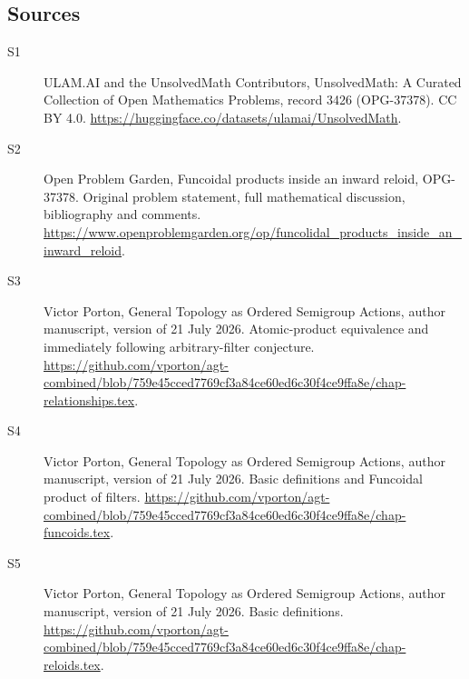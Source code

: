 \documentclass[11pt]{article}
\begin{document}
\subsection{Sources}
\begin{description}
\item[\hypertarget{source:3426:1}{S1}] ULAM.AI and the UnsolvedMath Contributors, UnsolvedMath: A Curated Collection of Open Mathematics Problems, record 3426 (OPG-37378). CC BY 4.0. \url{https://huggingface.co/datasets/ulamai/UnsolvedMath}.
\item[\hypertarget{source:3426:2}{S2}] Open Problem Garden, Funcoidal products inside an inward reloid, OPG-37378. Original problem statement, full mathematical discussion, bibliography and comments. \url{https://www.openproblemgarden.org/op/funcolidal_products_inside_an_inward_reloid}.
\item[\hypertarget{source:3426:3}{S3}] Victor Porton, General Topology as Ordered Semigroup Actions, author manuscript, version of 21 July 2026. Atomic-product equivalence and immediately following arbitrary-filter conjecture. \url{https://github.com/vporton/agt-combined/blob/759e45cced7769cf3a84ce60ed6c30f4ce9ffa8e/chap-relationships.tex}.
\item[\hypertarget{source:3426:4}{S4}] Victor Porton, General Topology as Ordered Semigroup Actions, author manuscript, version of 21 July 2026. Basic definitions and Funcoidal product of filters. \url{https://github.com/vporton/agt-combined/blob/759e45cced7769cf3a84ce60ed6c30f4ce9ffa8e/chap-funcoids.tex}.
\item[\hypertarget{source:3426:5}{S5}] Victor Porton, General Topology as Ordered Semigroup Actions, author manuscript, version of 21 July 2026. Basic definitions. \url{https://github.com/vporton/agt-combined/blob/759e45cced7769cf3a84ce60ed6c30f4ce9ffa8e/chap-reloids.tex}.
\end{description}
\label{end:3426}
\end{document}
